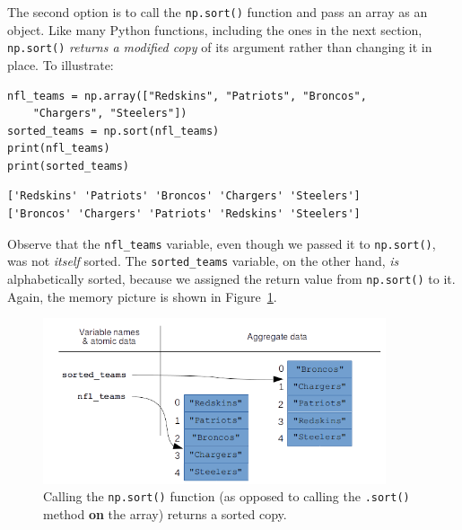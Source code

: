 The second option is to call the \texttt{np.sort()} function and pass an array
as an object. Like many Python functions, including the ones in the next
section, \texttt{np.sort()} \textit{returns a modified copy} of its argument
rather than changing it in place. To illustrate:

\begin{Verbatim}[fontsize=\small,samepage=true,frame=single,framesep=3mm]
nfl_teams = np.array(["Redskins", "Patriots", "Broncos",
    "Chargers", "Steelers"])
sorted_teams = np.sort(nfl_teams)
print(nfl_teams)
print(sorted_teams)
\end{Verbatim}

\begin{Verbatim}[fontsize=\small,samepage=true,frame=leftline,framesep=5mm,framerule=1mm]
['Redskins' 'Patriots' 'Broncos' 'Chargers' 'Steelers']
['Broncos' 'Chargers' 'Patriots' 'Redskins' 'Steelers']
\end{Verbatim}

Observe that the \texttt{nfl\_teams} variable, even though we passed it to
\texttt{np.sort()}, was not \textit{itself} sorted. The \texttt{sorted\_teams}
variable, on the other hand, \textit{is} alphabetically sorted, because we
assigned the return value from \texttt{np.sort()} to it. Again, the memory
picture is shown in Figure~\ref{fig:npSortArray}.

\begin{figure}[ht]
\centering
\includegraphics[width=0.9\textwidth]{npSortArray.png}
\medskip
\caption{Calling the \texttt{np.sort()} function (as opposed to calling the
\texttt{.sort()} method \textbf{on} the array) returns a sorted copy.}
\label{fig:npSortArray}
\end{figure}

